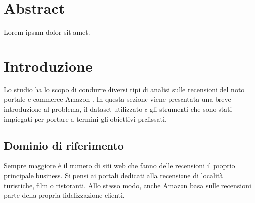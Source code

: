\documentclass[hidelinks, 12pt]{article}
\begin{document}


\null{}
\section*{\centering Abstract}

Lorem ipsum dolor sit amet.

 \null

\clearpage



\tableofcontents
\clearpage
\listoffigures
\listoftables
\pagebreak




\section{Introduzione}


Lo studio ha lo scopo di condurre diversi tipi di analisi sulle recensioni del noto portale e-commerce Amazon \cite{site:amazon}. In questa sezione viene presentata una breve introduzione al problema, il dataset utilizzato e gli strumenti che sono stati impiegati per portare a termini gli obiettivi prefissati.



\subsection{Dominio di riferimento}

Sempre maggiore è il numero di siti web che fanno delle recensioni il proprio principale business. Si pensi ai portali dedicati alla recensione di località turistiche, film o ristoranti. Allo stesso modo, anche Amazon basa sulle recensioni parte della propria fidelizzazione clienti.
\end{document}
